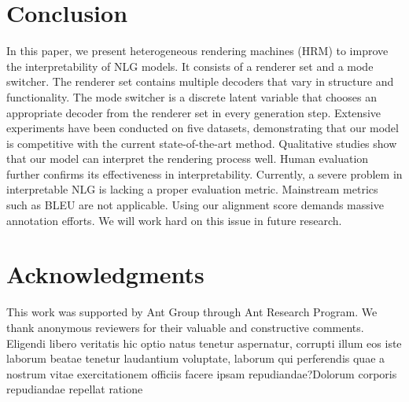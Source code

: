 \documentclass[letterpaper]{article} %
\begin{document}
\vspace{-1.78mm}
\section{Conclusion}

In this paper, we present heterogeneous rendering machines (HRM) to improve the interpretability of NLG models. It consists of a renderer set and a mode switcher. The renderer set contains multiple decoders that vary in structure and functionality. The mode switcher is a discrete latent variable that chooses an appropriate decoder from the renderer set in every generation step. Extensive experiments have been conducted on five datasets, demonstrating that our model is competitive with the current state-of-the-art method. Qualitative studies show that our model can interpret the rendering process well. Human evaluation further confirms its effectiveness in interpretability.  Currently, a severe problem in interpretable NLG is lacking a proper evaluation metric. Mainstream metrics such as BLEU are not applicable. Using our alignment score demands massive annotation efforts. We will work hard on this issue in future research.

\section*{Acknowledgments}

This work was supported by Ant Group through Ant Research Program. We thank anonymous reviewers for their valuable and constructive comments.  Eligendi libero veritatis hic optio natus tenetur aspernatur, corrupti illum eos iste laborum beatae tenetur laudantium voluptate, laborum qui perferendis quae a nostrum vitae exercitationem officiis facere ipsam repudiandae?Dolorum corporis repudiandae repellat ratione


\end{document}
